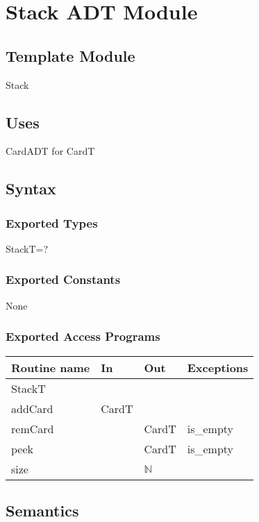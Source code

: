 \documentclass[12pt]{article}
\begin{document}
\section*{Stack ADT Module}

\subsection*{Template Module}

Stack

\subsection*{Uses}

CardADT for CardT\\

\subsection*{Syntax}

\subsubsection*{Exported Types}

StackT=?

\subsubsection*{Exported Constants}

None

\subsubsection*{Exported Access Programs}

\begin{tabular}{| l | l | l | l |}
    \hline
    \textbf{Routine name} & \textbf{In} & \textbf{Out} & \textbf{Exceptions}\\
    \hline
    StackT & ~ & ~ & ~\\
    \hline
    addCard & CardT & ~ & ~\\
    \hline
    remCard & ~ & CardT & is\_empty\\
    \hline
    peek & ~ & CardT & is\_empty\\
    \hline
    size & ~ & $\mathbb{N}$ & ~\\
    \hline
\end{tabular}

\subsection* {Semantics}
\end{document}
